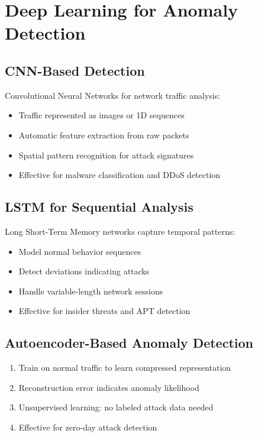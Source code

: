 \documentclass[12pt,a4paper]{article}
\begin{document}
\section{Deep Learning for Anomaly Detection}

\subsection{CNN-Based Detection}

Convolutional Neural Networks for network traffic analysis:
\begin{itemize}
    \item Traffic represented as images or 1D sequences
    \item Automatic feature extraction from raw packets
    \item Spatial pattern recognition for attack signatures
    \item Effective for malware classification and DDoS detection
\end{itemize}

\subsection{LSTM for Sequential Analysis}

Long Short-Term Memory networks capture temporal patterns:
\begin{itemize}
    \item Model normal behavior sequences
    \item Detect deviations indicating attacks
    \item Handle variable-length network sessions
    \item Effective for insider threats and APT detection
\end{itemize}

\subsection{Autoencoder-Based Anomaly Detection}

\begin{tcolorbox}[colback=mlblue!10, colframe=mlblue, title=Autoencoder Approach]
\begin{enumerate}
    \item Train on normal traffic to learn compressed representation
    \item Reconstruction error indicates anomaly likelihood
    \item Unsupervised learning: no labeled attack data needed
    \item Effective for zero-day attack detection
\end{enumerate}
\end{tcolorbox}
\end{document}
